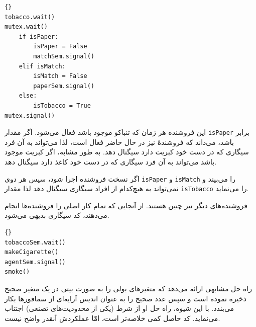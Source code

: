 \documentclass{book}
\begin{document}
\begin{latin}
\begin{latin}
\begin{lstlisting}[title={فروشنده \lr{A}}]{}
tobacco.wait()
mutex.wait()
    if isPaper:
        isPaper = False
        matchSem.signal()
    elif isMatch:
        isMatch = False
        paperSem.signal()
    else: 
        isTobacco = True
mutex.signal()
\end{lstlisting}
\end{latin}
\end{latin}

    این فروشنده هر زمان که تنباکو موجود باشد فعال می‌شود. اگر مقدار {\tt isPaper} برابر  باشد، می‌داند که فروشندهٔ‌  نیز در حال 
    حاضر فعال است، لذا می‌تواند به آن فرد سیگاری که در دست خود کبریت دارد سیگنال دهد. به طور مشابه، اگر کبریت موجود باشد می‌تواند به آن فرد 
    سیگاری که در دست خود کاغذ دارد سیگنال دهد. 

    اگر نسخت فروشنده  اجرا شود، سپس هر دوی {\tt isPaper} و  {\tt isMatch}  را  می‌بیند و نمی‌تواند به هیچ‌کدام از افراد 
    سیگاری سیگنال دهد لذا مقدار  {\tt isTobacco} را   می‌نماید. 

    فروشنده‌های دیگر نیز چنین هستند. از آنجایی که  تمام کار اصلی را فروشنده‌ها انجام می‌دهند، کد سیگاری بدیهی می‌شود.

\begin{latin}
\begin{latin}
\begin{lstlisting}[title={فرد سیگاری با تنباکو}]{}
tobaccoSem.wait()
makeCigarette()
agentSem.signal()
smoke()
\end{lstlisting}
\end{latin}
\end{latin}

    راه حل مشابهی ارائه می‌دهد که متغیرهای بولی را به صورت بیتی در یک متغیر صحیح ذخیره نموده است و سپس عدد صحیح را به عنوان 
    اندیس آرایه‌ای از سمافورها بکار می‌بندد. با این شیوه، راه حل او از شرط (یکی از محدودیت‌های تصنعی) اجتناب می‌نماید. 
    کد حاصل کمی خلاصه‌تر است، امّا عملکردش آنقدر واضح نیست. 
    
\end{document}
